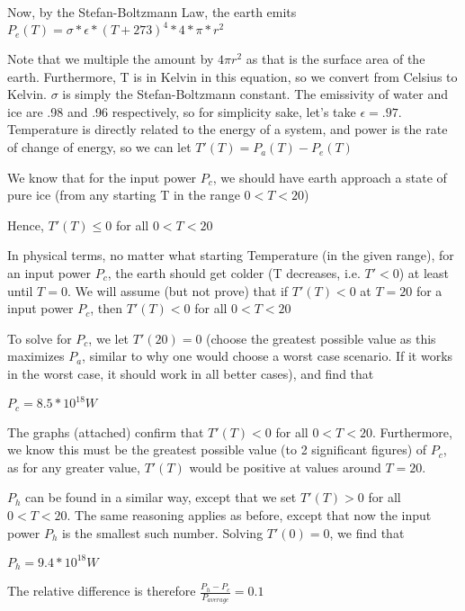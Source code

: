 \documentclass{article}
\begin{document}
Now, by the Stefan-Boltzmann Law, the earth emits $P_e(T) = \sigma*\epsilon*(T+273)^4*4*\pi*r^2$ 

Note that we multiple the amount by $4\pi r^2$ as that is the surface area of the earth.
Furthermore, T is in Kelvin in this equation, so we convert from Celsius to Kelvin.
$\sigma$ is simply the Stefan-Boltzmann constant.
The emissivity of water and ice are .98 and .96 respectively, so for simplicity sake, let's take $\epsilon = .97$.
Temperature is directly related to the energy of a system, and power is the rate of change of energy, so we can let $T'(T) = P_a(T) - P_e(T)$

We know that for the input power $P_c$, we should have earth approach a state of pure ice (from any starting T in the range $0<T<20$)

Hence, $T'(T) \le 0$ for all $0<T<20$ 

In physical terms, no matter what starting Temperature (in the given range), for an input power $P_c$, the earth should get colder (T decreases, i.e. $T' < 0$) at least until $T = 0$. We will assume (but not prove) that if $T'(T) < 0$ at $T = 20$ for a input power $P_c$, then $T'(T) < 0$ for all $0 < T < 20$

To solve for $P_c$, we let $T'(20)=0$ (choose the greatest possible value as this maximizes $P_a$, similar to why one would choose a worst case scenario. If it works in the worst case, it should work in all better cases), and find that

$P_c=8.5*10^{18} W$

The graphs (attached) confirm that $T'(T) < 0$ for all $0 < T < 20$. Furthermore, we know this must be the greatest possible value (to 2 significant figures) of $P_c$, as for any greater value, $T'(T)$ would be positive at values around $T=20$.

$P_h$ can be found in a similar way, except that we set $T'(T)>0$ for all  $0 < T < 20$. The same reasoning applies as before, except that now the input power $P_h$ is the smallest such number. Solving $T'(0)=0$, we find that 

$P_h=9.4*10^{18}W$

The relative difference is therefore $\frac{P_h-P_c}{P_{average}}=0.1$
\end{document}
